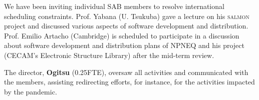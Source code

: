 We have been inviting individual SAB members to resolve international scheduling constraints. 
Prof. Yabana (U. Tsukuba)  gave a lecture on his \textsc{salmon} project and discussed various aspects of software development and distribution. 
Prof. Emilio Artacho (Cambridge) is scheduled to participate in a discussion about software development and distribution plans of NPNEQ and his project (CECAM's Electronic Structure Library) after the mid-term review.

The director, {\bf Ogitsu} (0.25FTE), oversaw all activities and communicated with the members, assisting redirecting efforts, for instance, for the activities impacted by the pandemic.



\clearpage

